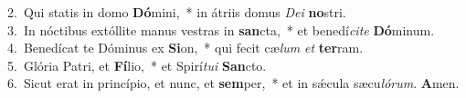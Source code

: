 {2.~}Qui statis in domo \textbf{Dó}mini,~* in átriis domus \textit{De}\textit{i} \textbf{no}stri.\\
{3.~}In nóctibus extóllite manus vestras in \textbf{san}cta,~* et benedí\textit{ci}\textit{te} \textbf{Dó}minum.\\
{4.~}Benedícat te Dóminus ex \textbf{Si}on,~* qui fecit cæ\textit{lum} \textit{et} \textbf{ter}ram.\\
{5.~}Glória Patri, et \textbf{Fí}lio,~* et Spirí\textit{tu}\textit{i} \textbf{San}cto.\\
{6.~}Sicut erat in princípio, et nunc, et \textbf{sem}per,~* et in sǽcula sæcu\textit{ló}\textit{rum}. \textbf{A}men.\\
